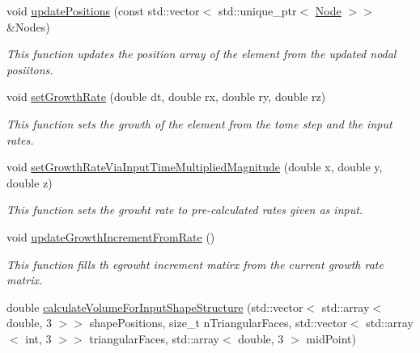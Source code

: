 \begin{DoxyCompactItemize}
\item 
\hypertarget{classShapeBase_a14199858399bf70d6cc1b33cfdd6bf01}{}void \hyperlink{classShapeBase_a14199858399bf70d6cc1b33cfdd6bf01}{update\+Positions} (const std\+::vector$<$ std\+::unique\+\_\+ptr$<$ \hyperlink{classNode}{Node} $>$$>$ \&Nodes)\label{classShapeBase_a14199858399bf70d6cc1b33cfdd6bf01}

\begin{DoxyCompactList}\small\item\em This function updates the position array of the element from the updated nodal posiitons. \end{DoxyCompactList}\item 
\hypertarget{classShapeBase_ac06c53088788e3c1461233623f506dbb}{}void \hyperlink{classShapeBase_ac06c53088788e3c1461233623f506dbb}{set\+Growth\+Rate} (double dt, double rx, double ry, double rz)\label{classShapeBase_ac06c53088788e3c1461233623f506dbb}

\begin{DoxyCompactList}\small\item\em This function sets the growth of the element from the tome step and the input rates. \end{DoxyCompactList}\item 
\hypertarget{classShapeBase_a9572e9a52675224dfada4f4de366f05d}{}void \hyperlink{classShapeBase_a9572e9a52675224dfada4f4de366f05d}{set\+Growth\+Rate\+Via\+Input\+Time\+Multiplied\+Magnitude} (double x, double y, double z)\label{classShapeBase_a9572e9a52675224dfada4f4de366f05d}

\begin{DoxyCompactList}\small\item\em This function sets the growht rate to pre-\/calculated rates given as input. \end{DoxyCompactList}\item 
\hypertarget{classShapeBase_ad7d7957431a1ae402347efb03ad94d0e}{}void \hyperlink{classShapeBase_ad7d7957431a1ae402347efb03ad94d0e}{update\+Growth\+Increment\+From\+Rate} ()\label{classShapeBase_ad7d7957431a1ae402347efb03ad94d0e}

\begin{DoxyCompactList}\small\item\em This function fills th egrowht increment matirx from the current growth rate matrix. \end{DoxyCompactList}\item 
\hypertarget{classShapeBase_aeda828c652c3253076530000226a5dbb}{}double \hyperlink{classShapeBase_aeda828c652c3253076530000226a5dbb}{calculate\+Volume\+For\+Input\+Shape\+Structure} (std\+::vector$<$ std\+::array$<$ double, 3 $>$$>$ shape\+Positions, size\+\_\+t n\+Triangular\+Faces, std\+::vector$<$ std\+::array$<$ int, 3 $>$$>$ triangular\+Faces, std\+::array$<$ double, 3 $>$ mid\+Point)\label{classShapeBase_aeda828c652c3253076530000226a5dbb}


\end{DoxyCompactItemize}
